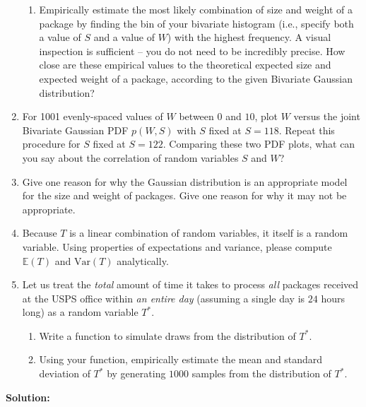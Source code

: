 \documentclass{harvardml}
\theoremstyle{definition}
\theoremstyle{plain}
\begin{document}
\begin{problem}
\begin{enumerate}
\begin{enumerate}
        \item Empirically estimate the most likely combination of size and weight of a package by finding the bin of your bivariate histogram (i.e., specify both a value of $S$ and a value of $W$) with the highest frequency. A visual inspection is sufficient -- you do not need to be incredibly precise.  How close are these empirical values to the theoretical expected size and expected weight of a package, according to the given Bivariate Gaussian distribution?
    \end{enumerate}
    \item For 1001 evenly-spaced values of $W$ between $0$ and $10$, plot $W$ versus the joint Bivariate Gaussian PDF $p(W, S)$ with $S$ fixed at $S=118$. Repeat this procedure for $S$ fixed at $S=122$. Comparing these two PDF plots, what can you say about the correlation of random variables $S$ and $W$?
    \item Give one reason for why the Gaussian distribution is an appropriate model for the size and weight of packages. Give one reason for why it may not be appropriate.
    \item Because $T$ is a linear combination of random variables, it itself is a random variable. Using properties of expectations and variance, please compute $\mathbb{E}(T)$ and $\mathrm{Var}(T)$ analytically.
    \item Let us treat the \textit{total} amount of time it takes to process \textit{all} packages received at the USPS office within \textit{an entire day} (assuming a single day is $24$ hours long) as a random variable $T^{*}$. 
    \begin{enumerate}
        \item Write a function to simulate draws from the distribution of $T^{*}$. 
        \item Using your function, empirically estimate the mean and standard deviation of $T^{*}$ by generating $1000$ samples from the distribution of $T^{*}$.
    \end{enumerate}
\end{enumerate}
\end{problem}
\textbf{Solution:}\\
\end{document}
